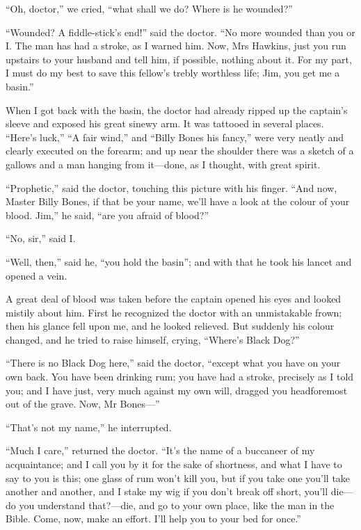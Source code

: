 \enquote{Oh, doctor,} we cried, \enquote{what shall we do? Where is he wounded?}

\enquote{Wounded? A fiddle-stick’s end!} said the doctor. \enquote{No more wounded than you or I. The man has had a stroke, as I warned him. Now, Mrs Hawkins, just you run upstairs to your husband and tell him, if possible, nothing about it. For my part, I must do my best to save this fellow’s trebly worthless life; Jim, you get me a basin.}

When I got back with the basin, the doctor had already ripped up the captain’s sleeve and exposed his great sinewy arm. It was tattooed in several places. \enquote{Here’s luck,} \enquote{A fair wind,} and \enquote{Billy Bones his fancy,} were very neatly and clearly executed on the forearm; and up near the shoulder there was a sketch of a gallows and a man hanging from it---done, as I thought, with great spirit.

\enquote{Prophetic,} said the doctor, touching this picture with his finger. \enquote{And now, Master Billy Bones, if that be your name, we’ll have a look at the colour of your blood. Jim,} he said, \enquote{are you afraid of blood?}

\enquote{No, sir,} said I.

\enquote{Well, then,} said he, \enquote{you hold the basin}; and with that he took his lancet and opened a vein.

A great deal of blood was taken before the captain opened his eyes and looked mistily about him. First he recognized the doctor with an unmistakable frown; then his glance fell upon me, and he looked relieved. But suddenly his colour changed, and he tried to raise himself, crying, \enquote{Where’s Black Dog?}

\enquote{There is no Black Dog here,} said the doctor, \enquote{except what you have on your own back. You have been drinking rum; you have had a stroke, precisely as I told you; and I have just, very much against my own will, dragged you headforemost out of the grave. Now, Mr Bones---}

\enquote{That’s not my name,} he interrupted.

\enquote{Much I care,} returned the doctor. \enquote{It’s the name of a buccaneer of my acquaintance; and I call you by it for the sake of shortness, and what I have to say to you is this; one glass of rum won’t kill you, but if you take one you’ll take another and another, and I stake my wig if you don’t break off short, you’ll die---do you understand that?---die, and go to your own place, like the man in the Bible. Come, now, make an effort. I’ll help you to your bed for once.}

